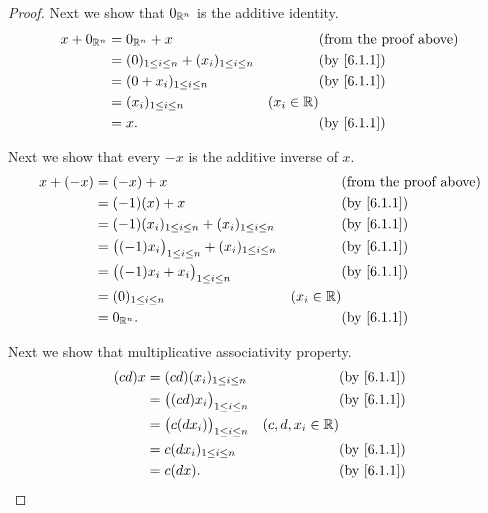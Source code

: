 \begin{proof}
  Next we show that \(0_{\mathbb{R}^n}\) is the additive identity.
  \begin{align*}
    x + 0_{\R^n} & = 0_{\R^n} + x                                    &              & \text{(from the proof above)} \\
                 & = (0)_{1 \leq i \leq n} + (x_i)_{1 \leq i \leq n} &              & \text{(by \cref{6.1.1})}      \\
                 & = (0 + x_i)_{1 \leq i \leq n}                     &              & \text{(by \cref{6.1.1})}      \\
                 & = (x_i)_{1 \leq i \leq n}                         & (x_i \in \R)                                 \\
                 & = x.                                              &              & \text{(by \cref{6.1.1})}
  \end{align*}

  Next we show that every \(-x\) is the additive inverse of \(x\).
  \begin{align*}
    x + (-x) & = (-x) + x                                                      &              & \text{(from the proof above)} \\
             & = (-1)(x) + x                                                   &              & \text{(by \cref{6.1.1})}      \\
             & = (-1)(x_i)_{1 \leq i \leq n} + (x_i)_{1 \leq i \leq n}         &              & \text{(by \cref{6.1.1})}      \\
             & = \big((-1)x_i\big)_{1 \leq i \leq n} + (x_i)_{1 \leq i \leq n} &              & \text{(by \cref{6.1.1})}      \\
             & = \big((-1)x_i + x_i\big)_{1 \leq i \leq n}                     &              & \text{(by \cref{6.1.1})}      \\
             & = (0)_{1 \leq i \leq n}                                         & (x_i \in \R)                                 \\
             & = 0_{\R^n}.                                                     &              & \text{(by \cref{6.1.1})}
  \end{align*}

  Next we show that multiplicative associativity property.
  \begin{align*}
    (cd)x & = (cd)(x_i)_{1 \leq i \leq n}          &                    & \text{(by \cref{6.1.1})} \\
          & = \big((cd) x_i\big)_{1 \leq i \leq n} &                    & \text{(by \cref{6.1.1})} \\
          & = \big(c(d x_i)\big)_{1 \leq i \leq n} & (c, d, x_i \in \R)                            \\
          & = c(d x_i)_{1 \leq i \leq n}           &                    & \text{(by \cref{6.1.1})} \\
          & = c(dx).                               &                    & \text{(by \cref{6.1.1})}
  \end{align*}


\end{proof}

